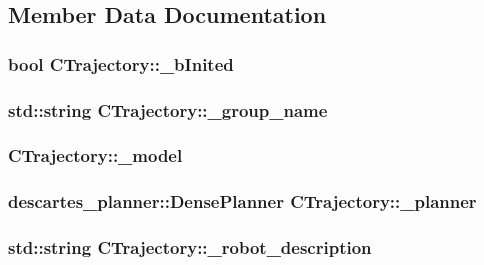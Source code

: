 \subsection{Member Data Documentation}
\hypertarget{classCTrajectory_a6246756ad10288a1d1f95b0957e5265a}{
\subsubsection[{\-\_\-b\-Inited}]{\setlength{\rightskip}{0pt plus 5cm}bool C\-Trajectory\-::\-\_\-b\-Inited}}\label{classCTrajectory_a6246756ad10288a1d1f95b0957e5265a}
\hypertarget{classCTrajectory_a145b56fb4674532680450bf4f319ce7e}{
\subsubsection[{\-\_\-group\-\_\-name}]{\setlength{\rightskip}{0pt plus 5cm}std\-::string C\-Trajectory\-::\-\_\-group\-\_\-name}}\label{classCTrajectory_a145b56fb4674532680450bf4f319ce7e}
\hypertarget{classCTrajectory_a7d28b9c47923a7e4a011396ae84533e8}{
\subsubsection[{\-\_\-model}]{ C\-Trajectory\-::\-\_\-model}}\label{classCTrajectory_a7d28b9c47923a7e4a011396ae84533e8}
\hypertarget{classCTrajectory_a8fe953c71fbceacadc2fe350b9d98665}{
\subsubsection[{\-\_\-planner}]{\setlength{\rightskip}{0pt plus 5cm}descartes\-\_\-planner\-::\-Dense\-Planner C\-Trajectory\-::\-\_\-planner}}\label{classCTrajectory_a8fe953c71fbceacadc2fe350b9d98665}
\hypertarget{classCTrajectory_a41901707521d77b431d6fc31a81a8d22}{
\subsubsection[{\-\_\-robot\-\_\-description}]{\setlength{\rightskip}{0pt plus 5cm}std\-::string C\-Trajectory\-::\-\_\-robot\-\_\-description}}\label{classCTrajectory_a41901707521d77b431d6fc31a81a8d22}
